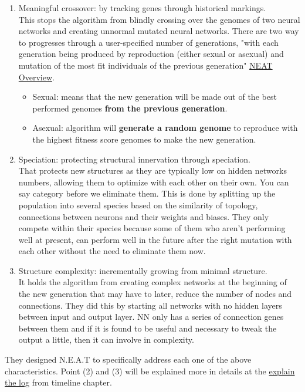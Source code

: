 \begin{enumerate} \label{list:3tweanns}
	\item Meaningful crossover: by tracking genes through historical markings.\\
	This stops the algorithm from blindly crossing over the genomes of two neural networks and creating unnormal mutated neural networks. There are two way to progresses through a user-specified number of generations, "with each generation being produced by reproduction (either sexual or asexual) and mutation of the most fit individuals of the previous generation" \href{https://neat-python.readthedocs.io/en/latest/neat_overview.html}{NEAT Overview}.
	\begin{itemize}
		\item Sexual: means that the new generation will be made out of the best performed genomes\textbf{ from the previous generation}.
		\item Asexual: algorithm will \textbf{generate a random genome} to reproduce with the highest fitness score genomes to make the new generation.
	\end{itemize}
	
	\item Speciation: protecting structural innervation through speciation.\\
	That protects new structures as they are typically low on hidden networks numbers, allowing them to optimize with each other on their own. You can say category before we eliminate them. This is done by splitting up the population into several species based on the similarity of topology, connections between neurons and their weights and biases. They only compete within their species because some of them who aren't performing well at present, can perform well in the future after the right mutation with each other without the need to eliminate them now.
	\item Structure complexity: incrementally growing from minimal structure.\\
	It holds the algorithm from creating complex networks at the beginning of the new generation that may have to later, reduce the number of nodes and connections. They did this by starting all networks with no hidden layers between input and output layer. NN only has a series of connection genes between them and if it is found to be useful and necessary to tweak the output a little, then it can involve in complexity.
\end{enumerate}

They designed N.E.A.T to specifically address each one of the above characteristics. Point (2) and (3) will be explained more in details at the \hyperref[sec:explain-the-log]{explain the log} from timeline chapter.




